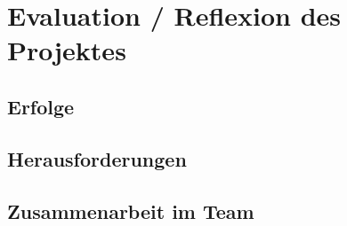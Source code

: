 \section{Evaluation / Reflexion des Projektes}

\lipsum[]

\subsection{Erfolge}

\lipsum[]

\subsection{Herausforderungen}

\lipsum[]

\subsection{Zusammenarbeit im Team}

\lipsum[]
